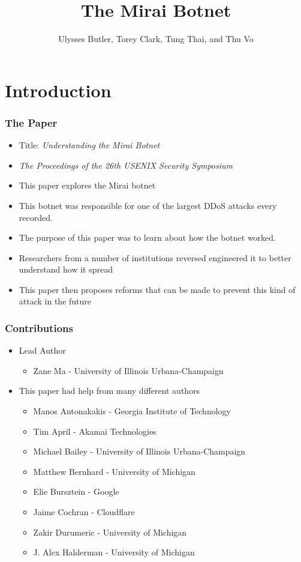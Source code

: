 \documentclass{beamer}
\title{The Mirai Botnet}
\author{Ulysses Butler, Torey Clark, Tung Thai, and Thu Vo}
\institute{ Truman State University \\ Binary Beasts }
\date{}
\begin{document}
\maketitle

\section{Introduction}

\begin{frame}
	\frametitle{The Paper}
	\begin{itemize}
		\item<+-> Title: \textit{Understanding the Mirai Botnet}
		\item<+-> \textit{The Proceedings of the 26th USENIX Security Symposium}
		\item<+-> This paper explores the Mirai botnet
		\item<+-> This botnet was responsible for one of the largest DDoS attacks every recorded.
		\item<+-> The purpose of this paper was to learn about how the botnet worked.
		\item<+-> Researchers from a number of institutions reversed engineered it to better understand how it spread
		\item<+-> This paper then proposes reforms that can be made to prevent this kind of attack in the future
	\end{itemize}
\end{frame}

\begin{frame}
	\frametitle{Contributions}
	\begin{itemize}
		\item<1-> Lead Author
		\begin{itemize}
			\item<1-> Zane Ma - University of Illinois Urbana-Champaign
		\end{itemize}
		\item<2-> This paper had help from many different authors
		\begin{itemize}
			\item<3-> Manos Antonakakis - Georgia Institute of Technology
			\item<3-> Tim April - Akamai Technologies
			\item<3-> Michael Bailey - University of Illinois Urbana-Champaign
			\item<3-> Matthew Bernhard - University of Michigan
			\item<3-> Elie Bursztein - Google
			\item<3-> Jaime Cochran - Cloudflare
			\item<3-> Zakir Durumeric - University of Michigan
			\item<3-> J. Alex Halderman - University of Michigan
		\end{itemize}
	\end{itemize}
\end{frame}
\end{document}
